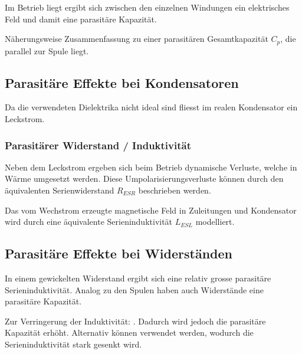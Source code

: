 \documentclass[10pt,a4paper]{scrartcl}
\begin{document}
\begin{multicols*}{3}
	Im Betrieb liegt ergibt sich zwischen den einzelnen Windungen ein elektrisches Feld und damit eine parasitäre Kapazität.
	
	Näherungsweise Zusammenfassung zu einer parasitären Gesamtkapazität $C_p$, die parallel zur Spule liegt.
	
	
	\subsection{Parasitäre Effekte bei Kondensatoren}
	
	Da die verwendeten Dielektrika nicht ideal sind fliesst im realen Kondensator ein Leckstrom.
	
	
	
 	
 	\vfill
 	\null
 	\columnbreak
 	
 	\subsubsection{Parasitärer Widerstand / Induktivität}
 	
 	Neben dem Leckstrom ergeben sich beim Betrieb dynamische Verluste, welche in Wärme umgesetzt werden. Diese Umpolarisierungsverluste können durch den äquivalenten Serienwiderstand $R_{ESR}$ beschrieben werden.
 	
 	Das vom Wechstrom erzeugte magnetische Feld in Zuleitungen und Kondensator wird durch eine äquivalente Serieninduktivität $L_{ESL}$ modelliert.
 	
 	
 	\vfill
 	\null
 	\columnbreak
	
	\subsection{Parasitäre Effekte bei Widerständen}
	
	In einem gewickelten Widerstand ergibt sich eine relativ grosse parasitäre Serieninduktivität. Analog zu den Spulen haben auch Widerstände eine parasitäre Kapazität.
	
	
	Zur Verringerung der Induktivität: . Dadurch wird jedoch die parasitäre Kapazität erhöht. Alternativ können  verwendet werden, wodurch die Serieninduktivität stark gesenkt wird.
	

\end{multicols*}
\end{document}

